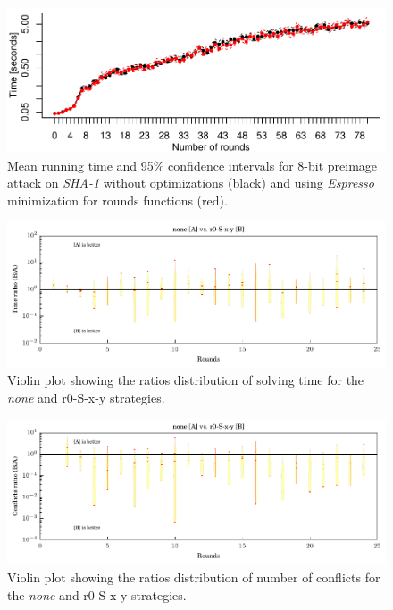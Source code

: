 \begin{figure}	
\centering \includegraphics{figures/opt-sha1/sha1-32bit-8bitref-cmp-espresso.pdf}
\caption{Mean running time and 95\% confidence intervals for $8$-bit preimage attack on \emph{SHA-1} without optimizations (black) and using \emph{Espresso} minimization for rounds functions (red).}
\label{fig:opt-sha1-cmp-espresso}
\end{figure}

\begin{figure}
\centering \includegraphics{figures/bo-ex1/ratio-time-none-r0sxy.pdf}
\caption{Violin plot showing the ratios distribution of solving time for the \emph{none} and {r0-S-x-y} strategies.}
\label{fig:bo-ratio-time-none-r0sxy}
\end{figure}

\begin{figure}
\centering \includegraphics{figures/bo-ex1/ratio-confl-none-r0sxy.pdf}
\caption{Violin plot showing the ratios distribution of number of conflicts for the \emph{none} and {r0-S-x-y} strategies.}
\label{fig:bo-ratio-confl-none-r0sxy}
\end{figure}


